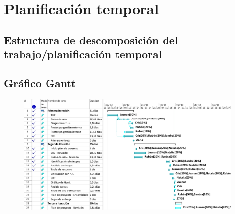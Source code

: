 \documentclass[11pt, a4paper, twoside, titlepage]{article}
\begin{document}
	\section{Planificación temporal}		
		\subsection{Estructura de descomposición del trabajo/planificación temporal}
			 

		\begin{landscape}
		\subsection{Gráfico Gantt}
			\begin{figure}[H] \centering
			\vspace{1.1cm}
			\includegraphics[scale=.8]{planific/Gantt.pdf}
			\end{figure}
		\end{landscape}
\end{document}
